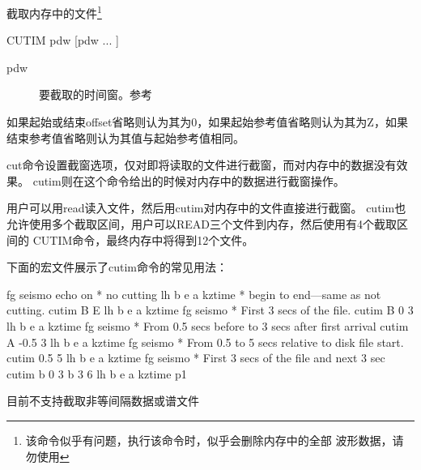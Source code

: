 \label{cmd:cutim}

截取内存中的文件\footnote{该命令似乎有问题，执行该命令时，似乎会删除内存中的全部
波形数据，请勿使用}

\begin{SACSTX}
CUTIM pdw [pdw ... ]
\end{SACSTX}

\begin{description}
\item [pdw] 要截取的时间窗。参考 
\end{description}

如果起始或结束offset省略则认为其为0，如果起始参考值省略则认为其为Z，如果结束参考值省略则认为其值与起始参考值相同。

cut命令设置截窗选项，仅对即将读取的文件进行截窗，而对内存中的数据没有效果。
cutim则在这个命令给出的时候对内存中的数据进行截窗操作。

用户可以用read读入文件，然后用cutim对内存中的文件直接进行截窗。
cutim也允许使用多个截取区间，用户可以READ三个文件到内存，然后使用有4个截取区间的
CUTIM命令，最终内存中将得到12个文件。

下面的宏文件展示了cutim命令的常见用法：
\begin{SACCode}
fg seismo
echo on
* no cutting
lh b e a kztime
* begin to end---same as not cutting.
cutim B E
lh b e a kztime
fg seismo
* First 3 secs of the file.
cutim B 0 3
lh b e a kztime
fg seismo
* From 0.5 secs before to 3 secs after first arrival
cutim A -0.5 3
lh b e a kztime
fg seismo
* From 0.5 to 5 secs relative to disk file start.
cutim 0.5 5
lh b e a kztime
fg seismo
* First 3 secs of the file and next 3 sec
cutim b 0 3 b 3 6
lh b e a kztime
p1
\end{SACCode}

目前不支持截取非等间隔数据或谱文件
